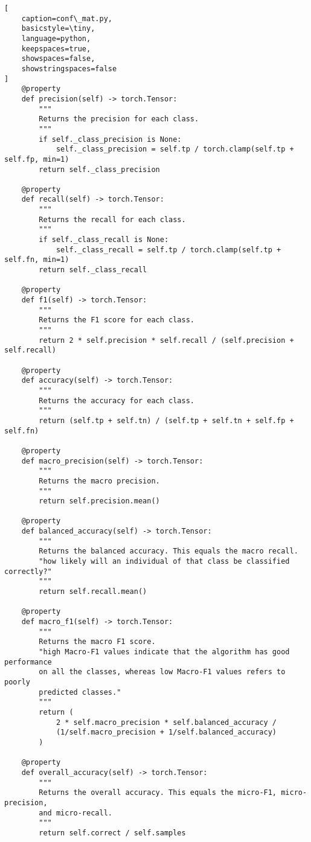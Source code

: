 \begin{lstlisting}[
    caption=conf\_mat.py,
    basicstyle=\tiny,
    language=python,
    keepspaces=true,
    showspaces=false,
    showstringspaces=false
]
    @property
    def precision(self) -> torch.Tensor:
        """
        Returns the precision for each class.
        """
        if self._class_precision is None:
            self._class_precision = self.tp / torch.clamp(self.tp + self.fp, min=1)
        return self._class_precision

    @property
    def recall(self) -> torch.Tensor:
        """
        Returns the recall for each class.
        """
        if self._class_recall is None:
            self._class_recall = self.tp / torch.clamp(self.tp + self.fn, min=1)
        return self._class_recall

    @property
    def f1(self) -> torch.Tensor:
        """
        Returns the F1 score for each class.
        """
        return 2 * self.precision * self.recall / (self.precision + self.recall)

    @property
    def accuracy(self) -> torch.Tensor:
        """
        Returns the accuracy for each class.
        """
        return (self.tp + self.tn) / (self.tp + self.tn + self.fp + self.fn)

    @property
    def macro_precision(self) -> torch.Tensor:
        """
        Returns the macro precision.
        """
        return self.precision.mean()

    @property
    def balanced_accuracy(self) -> torch.Tensor:
        """
        Returns the balanced accuracy. This equals the macro recall.
        "how likely will an individual of that class be classified correctly?"
        """
        return self.recall.mean()
    
    @property
    def macro_f1(self) -> torch.Tensor:
        """
        Returns the macro F1 score. 
        "high Macro-F1 values indicate that the algorithm has good performance
        on all the classes, whereas low Macro-F1 values refers to poorly
        predicted classes."
        """
        return (
            2 * self.macro_precision * self.balanced_accuracy / 
            (1/self.macro_precision + 1/self.balanced_accuracy)
        )

    @property
    def overall_accuracy(self) -> torch.Tensor:
        """
        Returns the overall accuracy. This equals the micro-F1, micro-precision,
        and micro-recall.
        """
        return self.correct / self.samples

\end{lstlisting}